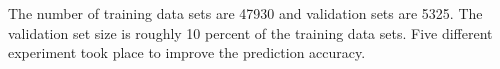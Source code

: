 The number of training data sets are 47930 and validation sets are 5325. The validation set size is
roughly 10 percent of the training data sets. Five different experiment took place to improve the
prediction accuracy.